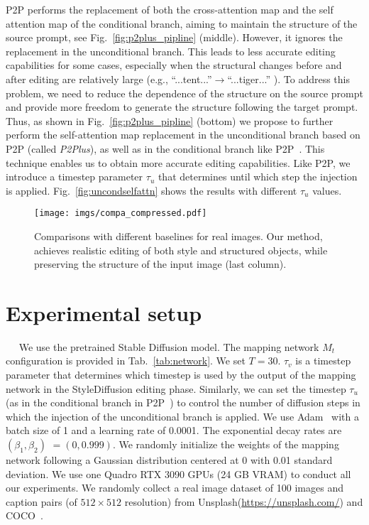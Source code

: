 \documentclass[twocolumn]{svjour3}          \smartqed  \usepackage{graphicx}
\newcommand{\minisection}[1]{\vspace{0.04in} \noindent {\bf #1}\ \ }
\begin{document}
P2P performs the replacement of both the cross-attention map and the self attention map of the conditional branch,  aiming to maintain the structure of the source prompt, see Fig.~\ref{fig:p2plus_pipline} (middle). However, it  ignores the replacement in the unconditional branch. This leads to less accurate editing capabilities for some cases, especially when the structural changes before and after editing 
are relatively large (e.g., “...tent...”$\rightarrow$“...tiger...” ).  To address this problem, we need to reduce the dependence of the structure on the source prompt and provide more freedom to generate the structure following the target prompt. Thus, as shown in Fig.~\ref{fig:p2plus_pipline} (bottom) we propose to further perform the self-attention map replacement in  the unconditional branch based on P2P (called \textit{P2Plus}), as well as in the conditional branch like P2P~\citep{hertz2022prompt}.   This technique enables us to obtain more accurate editing capabilities.  Like P2P, we introduce   a timestep parameter $\tau_u$ that determines until which step the injection is applied. Fig.~\ref{fig:uncondselfattn} shows the results with different  $\tau_u$  values. 
 


\begin{figure*}
    \centering
    \texttt{[image: imgs/compa\_compressed.pdf]}
    \vspace{-10pt}
    \caption{Comparisons with different baselines for real images.  
        Our method, achieves realistic editing of both style and structured objects, while preserving the structure of the input image (last column).  }
    \label{fig:cat2dog}
\end{figure*}




\section{Experimental setup}
\vspace{-2mm}
\minisection{Training details and datasets.} 
We use the pretrained Stable Diffusion model. The mapping network $M_t$ configuration is provided in Tab.~\ref{tab:network}. We set $T=30$. $\tau_v$ is a timestep parameter that determines which timestep is used by the output of the mapping network in the StyleDiffusion editing phase. Similarly, we can set the timestep $\tau_u$ (as in the conditional branch in P2P~\citep{hertz2022prompt}) to control the number of diffusion steps in which the injection of the unconditional branch is applied.
We use Adam~\cite{kingma2014adam} with a batch size of 1 and a learning rate of 0.0001. The exponential decay rates are $( \beta_{1},\beta_{2})$ $= (0, 0.999)$. We randomly initialize the weights of the mapping network following a Gaussian distribution centered at 0 with 0.01 standard deviation. We use one Quadro RTX 3090 GPUs (24 GB VRAM) to conduct all our experiments.  We randomly collect a real image dataset of 100 images and caption pairs (of $512 \times 512$ resolution) from Unsplash(\url{https://unsplash.com/}) and COCO~\citep{chen2015microsoft}.
\end{document}
